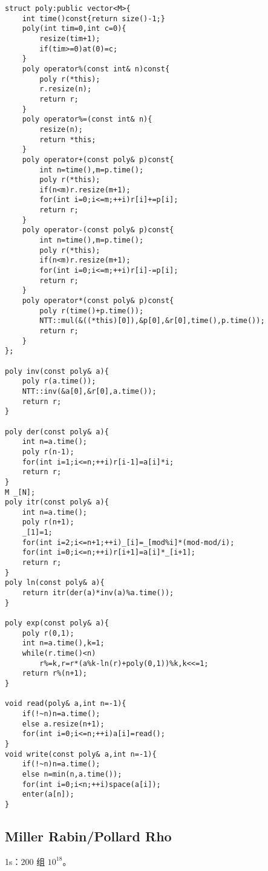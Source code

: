 \documentclass{ctexart}
\begin{document}
\begin{lstlisting}
struct poly:public vector<M>{
	int time()const{return size()-1;}
	poly(int tim=0,int c=0){
		resize(tim+1);
		if(tim>=0)at(0)=c;
	}
	poly operator%(const int& n)const{
		poly r(*this);
		r.resize(n);
		return r;
	}
	poly operator%=(const int& n){
		resize(n);
		return *this;
	}
	poly operator+(const poly& p)const{
		int n=time(),m=p.time();
		poly r(*this);
		if(n<m)r.resize(m+1);
		for(int i=0;i<=m;++i)r[i]+=p[i];
		return r;
	}
	poly operator-(const poly& p)const{
		int n=time(),m=p.time();
		poly r(*this);
		if(n<m)r.resize(m+1);
		for(int i=0;i<=m;++i)r[i]-=p[i];
		return r;
	}
	poly operator*(const poly& p)const{
		poly r(time()+p.time());
		NTT::mul(&((*this)[0]),&p[0],&r[0],time(),p.time());
		return r;
	}
};

poly inv(const poly& a){
	poly r(a.time());
	NTT::inv(&a[0],&r[0],a.time());
	return r;
}

poly der(const poly& a){
	int n=a.time();
	poly r(n-1);
	for(int i=1;i<=n;++i)r[i-1]=a[i]*i;
	return r;
}
M _[N];
poly itr(const poly& a){
	int n=a.time();
	poly r(n+1);
	_[1]=1;
	for(int i=2;i<=n+1;++i)_[i]=_[mod%i]*(mod-mod/i);
	for(int i=0;i<=n;++i)r[i+1]=a[i]*_[i+1];
	return r;
}
poly ln(const poly& a){
	return itr(der(a)*inv(a)%a.time());
}

poly exp(const poly& a){
	poly r(0,1);
	int n=a.time(),k=1;
	while(r.time()<n)
		r%=k,r=r*(a%k-ln(r)+poly(0,1))%k,k<<=1;
	return r%(n+1);
}

void read(poly& a,int n=-1){
	if(!~n)n=a.time();
	else a.resize(n+1);
	for(int i=0;i<=n;++i)a[i]=read();
}
void write(const poly& a,int n=-1){
	if(!~n)n=a.time();
	else n=min(n,a.time());
	for(int i=0;i<n;++i)space(a[i]);
	enter(a[n]);
}
\end{lstlisting}

\subsection{Miller Rabin/Pollard Rho}

1s：$200$ 组 $10^{18}$。
\end{document}
